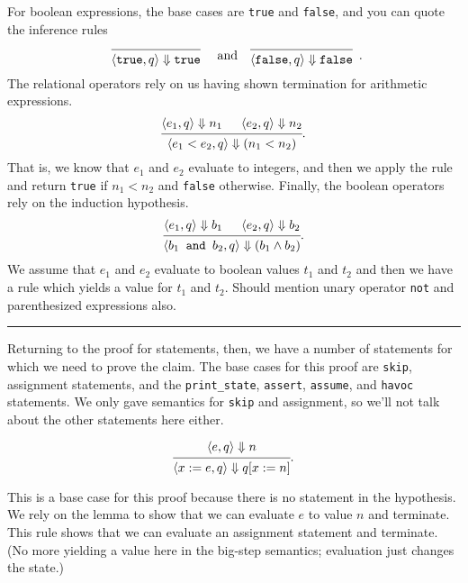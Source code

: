 \documentclass[11pt]{article}
\newcommand{\qedsymbol}{\rule{1ex}{1ex}}
\begin{document}
For boolean expressions, the base cases are \texttt{true} and \texttt{false}, and you can quote the inference
rules
\[
\begin{array}{ccc}
  \begin{prooftree}
  \infer0{\langle \texttt{true}, q \rangle \Downarrow \texttt{true}},
\end{prooftree} & \textrm{ and~~ }
\begin{prooftree}
  \infer0{\langle \texttt{false}, q \rangle \Downarrow \texttt{false}}
\end{prooftree}
\end{array}.
\]
The relational operators rely on us having shown termination for arithmetic expressions.
\[
  \begin{prooftree}
    \hypo{\langle e_1, q \rangle \Downarrow n_1}
    \hypo{\langle e_2, q \rangle \Downarrow n_2}
  \infer2{\langle e_1 < e_2, q \rangle \Downarrow (n_1 < n_2)}
  \end{prooftree}
  .
\]
That is, we know that $e_1$ and $e_2$ evaluate to integers, and then we apply the rule and return
\texttt{true} if $n_1 < n_2$ and \texttt{false} otherwise.
Finally, the boolean operators rely on the induction hypothesis.
\[
  \begin{prooftree}
    \hypo{\langle e_1, q \rangle \Downarrow b_1}
    \hypo{\langle e_2, q \rangle \Downarrow b_2}
  \infer2{\langle b_1 \texttt{~and~} b_2, q \rangle \Downarrow (b_1 \wedge b_2)}
  \end{prooftree}
  .
\]
We assume that $e_1$ and $e_2$ evaluate to boolean values $t_1$ and $t_2$ and then we have a rule which
yields a value for $t_1$ and $t_2$. Should mention unary operator \texttt{not} and parenthesized expressions also. ~~\qedsymbol

Returning to the proof for statements, then, we have a number of statements for which we need to prove the claim.
The base cases for this proof are \texttt{skip}, assignment statements, and the \texttt{print\_state},
\texttt{assert}, \texttt{assume}, and \texttt{havoc} statements. We only gave semantics for \texttt{skip} and
assignment, so we'll not talk about the other statements here either.

\[
  \begin{prooftree}
    \hypo{\langle e, q \rangle \Downarrow n}
  \infer1{\langle x := e, q \rangle \Downarrow q[x:=n]}
  \end{prooftree}
  .
\]

This is a base case for this proof because there is no statement in
the hypothesis. We rely on the lemma to show that we can evaluate $e$
to value $n$ and terminate. This rule shows that we can evaluate an
assignment statement and terminate. (No more yielding a value here in
the big-step semantics; evaluation just changes the state.)
\end{document}
